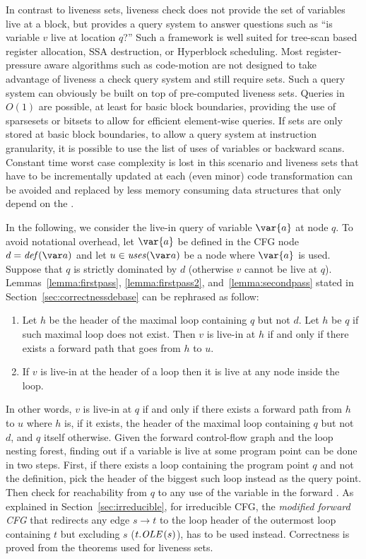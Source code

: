 In contrast to liveness sets, liveness check does not provide the set of variables live at a block, but provides a query system to answer questions such as ``is variable $v$ live at location $q$?''
Such a framework is well suited for tree-scan based register allocation, SSA destruction, or Hyperblock scheduling.
Most register-pressure aware algorithms such as code-motion are not designed to take advantage of liveness a check query system and still require sets.
Such a query system can obviously be built on top of pre-computed liveness sets.
Queries in $O(1)$ are possible, at least for basic block boundaries, providing the use of sparsesets or bitsets to allow for efficient element-wise queries.
If sets are only stored at basic block boundaries, to allow a query system at instruction granularity, it is possible to use the list of uses of variables or backward scans.
Constant time worst case complexity is lost in this scenario and liveness sets that have to be incrementally updated at each (even minor) code transformation can be avoided and replaced by less memory consuming data structures that only depend on the \@CFG.

In the following, we consider the live-in query of variable $\var{a}$ at node $q$.
To avoid notational overhead, let $\var{a}$ be defined in the CFG node $d=\ldef{a}$ and let $u \in \luse{a}$ be a node where $\var{a}$ is used.
Suppose that $q$ is strictly dominated by $d$ (otherwise $v$ cannot be live at $q$).
Lemmas~\ref{lemma:firstpass}, \ref{lemma:firstpass2}, and~\ref{lemma:secondpass} stated in Section~\ref{sec:correctnessdebase} can be rephrased as follow:
\begin{enumerate}
\item
	Let $h$ be the header of the maximal loop containing $q$ but not $d$.
	Let $h$ be $q$ if such maximal loop does not exist.
	Then $v$ is live-in at $h$ if and only if there exists a forward path that goes from $h$ to $u$.
\item
	If $v$ is live-in at the header of a loop then it is live at any node inside the loop.
\end{enumerate}

In other words, $v$ is live-in at $q$ if and only if there exists a forward path from $h$ to $u$ where $h$ is, if it exists, the header of the maximal loop containing $q$ but not $d$, and $q$ itself otherwise.
Given the forward control-flow graph and the loop nesting forest, finding out if a variable is live at some program point can be done in two steps.
First, if there exists a loop containing the program point $q$ and not the definition, pick the header of the biggest such loop instead as the query point.
Then check for reachability from $q$ to any use of the variable in the forward \@CFG.
As explained in Section~\ref{sec:irreducible}, for irreducible CFG, the \emph{modified forward CFG} that redirects any edge $s\rightarrow t$ to the loop header of the outermost loop containing $t$ but excluding $s$ ($t.\textit{OLE}\,(s)$), has to be used instead.
Correctness is proved from the theorems used for liveness sets.

